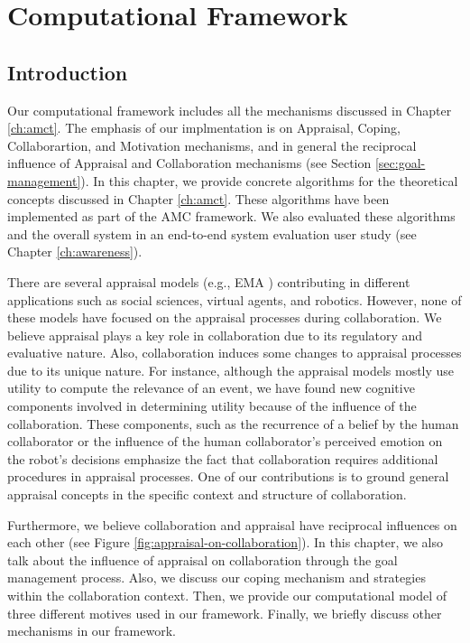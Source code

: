 \documentclass[12pt]{report}
\begin{document}
\chapter{Computational Framework}
\label{ch:appraisals}

\vspace*{-2mm}
\section{Introduction}
\vspace*{-3mm}
{\color{red}Our computational framework includes all the mechanisms discussed in
Chapter \ref{ch:amct}. The emphasis of our implmentation is on Appraisal, Coping,
Collaborartion, and Motivation mechanisms, and in general the reciprocal
influence of Appraisal and Collaboration mechanisms (see Section
\ref{sec:goal-management}). In this chapter, we provide concrete algorithms for
the theoretical concepts discussed in Chapter \ref{ch:amct}. These algorithms
have been implemented as part of the AMC framework. We also evaluated these
algorithms and the overall system in an end-to-end system evaluation user study
(see Chapter \ref{ch:awareness}).}

There are several appraisal models (e.g., EMA \cite{marsella:ema-process-model})
contributing in different applications such as social sciences, virtual agents,
and robotics. However, none of these models have focused on the appraisal
processes during collaboration. We believe appraisal plays a key role in
collaboration due to its regulatory and evaluative nature. Also, collaboration
induces some changes to appraisal processes due to its unique nature. For
instance, although the appraisal models mostly use utility to compute the
relevance of an event, we have found new cognitive components involved in
determining utility because of the influence of the collaboration. These
components, such as the recurrence of a belief by the human collaborator or the
influence of the human collaborator's perceived emotion on the robot's decisions
emphasize the fact that collaboration requires additional procedures in
appraisal processes. One of our contributions is to ground general appraisal
concepts in the specific context and structure of collaboration.

Furthermore, we believe collaboration and appraisal have reciprocal influences
on each other (see Figure \ref{fig:appraisal-on-collaboration}). In this
chapter, we also talk about the influence of appraisal on collaboration through
the goal management process. Also, we discuss our coping mechanism and
strategies within the collaboration context. Then, we provide our computational
model of three different motives used in our framework. Finally, we briefly
discuss other mechanisms in our framework.
\end{document}
